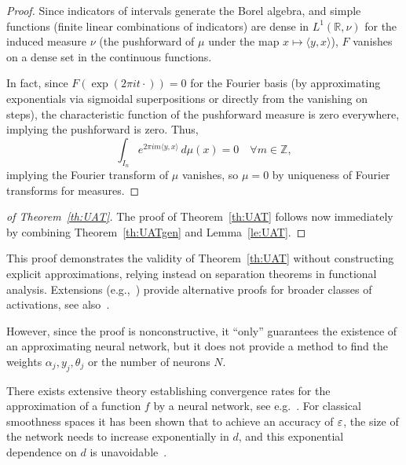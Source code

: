 \begin{proof}
Since indicators of intervals generate the Borel algebra, and simple functions (finite linear combinations of indicators) are dense in $ L^1(\mathbb{R}, \nu) $ for the induced measure $\nu$ (the pushforward of $\mu$ under the map $x \mapsto \langle y, x\rangle $), $ F$ vanishes on a dense set in the continuous functions.

In fact, since $F(\exp(2\pi i t \cdot)) = 0$ for the Fourier basis (by approximating exponentials via sigmoidal superpositions or directly from the vanishing on steps), the characteristic function of the pushforward measure is zero everywhere, implying the pushforward is zero. 
Thus,
$$
\int_{I_n} e^{2\pi i m \langle y, x\rangle} \, d\mu(x) = 0 \quad \forall m \in \mathbb{Z},
$$
implying the Fourier transform of $\mu$ vanishes, so $\mu = 0$ by uniqueness of Fourier transforms for measures. 
\end{proof}

\begin{proof}[of Theorem~\ref{th:UAT}]
The proof of  Theorem~\ref{th:UAT} follows now immediately by combining Theorem~\ref{th:UATgen} and Lemma~\ref{le:UAT}. 
\end{proof}

This proof demonstrates the validity of Theorem~\ref{th:UAT} without constructing explicit approximations, relying instead on separation theorems in functional analysis. Extensions (e.g.,~\cite{hornik1990universal,hornik1991approximation}) provide alternative proofs for broader classes of activations, see also~\cite{petersen2024mathematical}.


However, since the proof is nonconstructive, it ``only'' guarantees the existence of an approximating neural network, but it does not provide a method to find the weights $ \alpha_j, y_j, \theta_j $ or the number of neurons $ N $.

There exists extensive theory  establishing convergence rates for the approximation of a function $f$ by a neural network, see e.g.~\cite{mhaskar1993approximation,pinkus1999approximation,devore1998nonlinear}. For classical smoothness spaces it has been shown that to achieve an accuracy of $\varepsilon$, the size of the network needs to increase exponentially in $d$, and this exponential dependence on $d$ is unavoidable~\cite{novak2009approximation,devore1998nonlinear}. 

